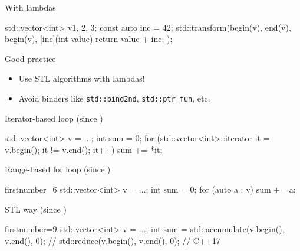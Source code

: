 \begin{frame}[fragile]
  \begin{exampleblock}{With lambdas}
    \begin{cppcode*}{}
      std::vector<int> v{1, 2, 3};
      const auto inc = 42;
      std::transform(begin(v), end(v), begin(v),
                     [inc](int value) {
                       return value + inc;
                     });
    \end{cppcode*}
  \end{exampleblock}
  \pause
  \begin{exampleblock}{Good practice}
    \begin{itemize}
      \item Use STL algorithms with lambdas!
      \item Avoid binders like \texttt{std::bind2nd}, \texttt{std::ptr_fun}, etc.
    \end{itemize}
  \end{exampleblock}
\end{frame}

\begin{frame}[fragile]
  \begin{block}{Iterator-based loop (since )}
    \begin{cppcode*}{}
      std::vector<int> v = ...;
      int sum = 0;
      for (std::vector<int>::iterator it = v.begin();
           it != v.end(); it++)
        sum += *it;
    \end{cppcode*}
  \end{block}
  \pause
  \begin{block}{Range-based for loop (since )}
    \begin{cppcode*}{firstnumber=6}
      std::vector<int> v = ...;
      int sum = 0;
      for (auto a : v) { sum += a; }
    \end{cppcode*}
  \end{block}
  \pause
  \begin{exampleblock}{STL way (since )}
    \begin{cppcode*}{firstnumber=9}
      std::vector<int> v = ...;
      int sum = std::accumulate(v.begin(), v.end(), 0);
      // std::reduce(v.begin(), v.end(), 0); // C++17
    \end{cppcode*}
  \end{exampleblock}
\end{frame}

